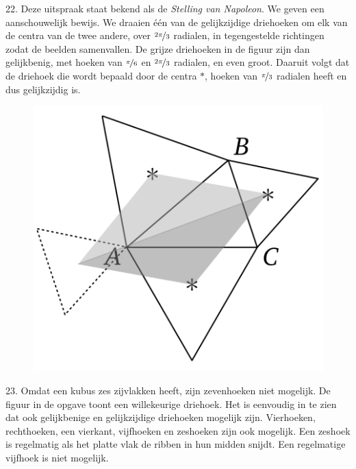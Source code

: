 \begin{problem}{22.}
    Deze uitspraak staat bekend als de \textit{Stelling van Napoleon}. We geven een aanschouwelijk bewijs. We draaien één van de gelijkzijdige driehoeken om elk van de centra van de twee andere, over $\nicefrac{2 \pi}{3}$ radialen, in tegengestelde richtingen zodat de beelden samenvallen. De grijze driehoeken in de figuur zijn dan gelijkbenig, met hoeken van $\nicefrac{\pi}{6}$ en $\nicefrac{2 \pi}{3}$ radialen, en even groot. Daaruit volgt dat de driehoek die wordt bepaald door de centra $*$, hoeken van $\nicefrac{\pi}{3}$ radialen heeft en dus gelijk\-zijdig is.
    \begin{figure}
		\includegraphics[scale=0.15]{resources/oplossing22}
	\end{figure}
\end{problem}

\clearpage

\begin{problem}{23.}
    Omdat een kubus zes zijvlakken heeft, zijn zevenhoeken niet mogelijk. De figuur in de opgave toont een willekeurige driehoek. Het is eenvoudig in te zien dat ook gelijkbenige en gelijkzijdige driehoeken mogelijk zijn. Vierhoeken, rechthoeken, een vierkant, vijfhoeken en zeshoeken zijn ook mogelijk. Een zeshoek is regelmatig als het platte vlak de ribben in hun midden snijdt. Een regelmatige vijfhoek is niet mogelijk.
\end{problem}

